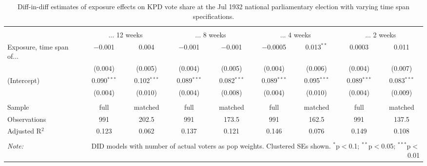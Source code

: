 
\begin{table}[!htbp] \centering 
  \caption{Diff-in-diff estimates of exposure effects on KPD vote share at the Jul 1932 national parliamentary election with varying time span specifications.\vspace{-.25cm}} 
  \label{tab:nsdap-voteshare-kpd-timespan-dd-1932-1} 
\scriptsize 
\begin{tabular}{@{\extracolsep{5pt}}lcccccccc} 
\\[-1.8ex]\hline 
\hline \\[-1.8ex] 
 & \multicolumn{2}{c}{... 12 weeks} & \multicolumn{2}{c}{... 8 weeks} & \multicolumn{2}{c}{... 4 weeks} & \multicolumn{2}{c}{... 2 weeks} \\ 
 \cmidrule(r){2-3}\cmidrule(r){4-5}\cmidrule(r){6-7}\cmidrule(r){8-9}Exposure, time span of... & $-$0.001 & 0.004 & $-$0.001 & $-$0.001 & $-$0.0005 & 0.013$^{**}$ & 0.0003 & 0.011 \\ 
  & (0.004) & (0.005) & (0.004) & (0.005) & (0.004) & (0.006) & (0.004) & (0.007) \\ 
  (Intercept) & 0.090$^{***}$ & 0.102$^{***}$ & 0.089$^{***}$ & 0.082$^{***}$ & 0.089$^{***}$ & 0.095$^{***}$ & 0.089$^{***}$ & 0.083$^{***}$ \\ 
  & (0.004) & (0.010) & (0.004) & (0.008) & (0.004) & (0.010) & (0.004) & (0.009) \\ 
 \hline \\[-1.8ex] 
Sample & full & matched & full & matched & full & matched & full & matched \\ 
Observations & 991 & 202.5 & 991 & 173.5 & 991 & 162.5 & 991 & 137.5 \\ 
Adjusted R$^{2}$ & 0.123 & 0.062 & 0.137 & 0.121 & 0.146 & 0.076 & 0.149 & 0.108 \\ 
\hline 
\hline \\[-1.8ex] 
\textit{Note:}  & \multicolumn{8}{r}{DID models with number of actual voters as pop weights. Clustered SEs shown. $^{*}$p$<$0.1; $^{**}$p$<$0.05; $^{***}$p$<$0.01} \\ 
\end{tabular} 
\end{table} 
